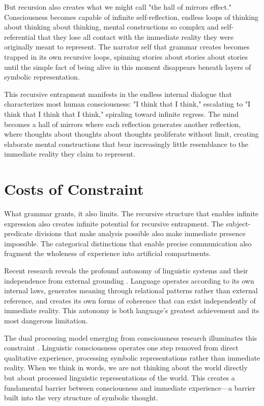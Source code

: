But recursion also creates what we might call "the hall of mirrors effect." Consciousness becomes capable of infinite self-reflection, endless loops of thinking about thinking about thinking, mental constructions so complex and self-referential that they lose all contact with the immediate reality they were originally meant to represent. The narrator self that grammar creates becomes trapped in its own recursive loops, spinning stories about stories about stories until the simple fact of being alive in this moment disappears beneath layers of symbolic representation.

This recursive entrapment manifests in the endless internal dialogue that characterizes most human consciousness: "I think that I think," escalating to "I think that I think that I think," spiraling toward infinite regress. The mind becomes a hall of mirrors where each reflection generates another reflection, where thoughts about thoughts about thoughts proliferate without limit, creating elaborate mental constructions that bear increasingly little resemblance to the immediate reality they claim to represent.

\section{Costs of Constraint}

What grammar grants, it also limits. The recursive structure that enables infinite expression also creates infinite potential for recursive entrapment. The subject-predicate divisions that make analysis possible also make immediate presence impossible. The categorical distinctions that enable precise communication also fragment the wholeness of experience into artificial compartments.

Recent research reveals the profound autonomy of linguistic systems and their independence from external grounding \parencite{palmer2025agnostic}. Language operates according to its own internal laws, generates meaning through relational patterns rather than external reference, and creates its own forms of coherence that can exist independently of immediate reality. This autonomy is both language's greatest achievement and its most dangerous limitation.

The dual processing model emerging from consciousness research illuminates this constraint \parencite{li2024memory}. Linguistic consciousness operates one step removed from direct qualitative experience, processing symbolic representations rather than immediate reality. When we think in words, we are not thinking about the world directly but about processed linguistic representations of the world. This creates a fundamental barrier between consciousness and immediate experience—a barrier built into the very structure of symbolic thought.

